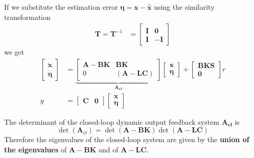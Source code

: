 If we substitute the estimation error $\bm{\eta}=\textbf{x}-\hat{\textbf{x}}$ using the similarity transformation
\begin{align*}
    \mathbf{T} =\mathbf{T}^{-1} & =\begin{bmatrix}
                                       \mathbf{I} & \mathbf{0}  \\
                                       \mathbf{I} & \mathbf{-I}
                                   \end{bmatrix}
\end{align*}
we get
\begin{align*}
    \begin{bmatrix}
        \dot{\mathbf{x}} \\
        \dot{\bm{\eta}}
    \end{bmatrix}
      & =
    \underbrace{
        \begin{bmatrix}
            \mathbf{A}-\mathbf{BK} & \mathbf{BK}              \\
            0                      & (\mathbf{A}-\mathbf{LC})
        \end{bmatrix}
    }_{\mathbf{A_{cl}}}
    \begin{bmatrix}
        \mathbf{x} \\
        \bm{\eta}
    \end{bmatrix}
    +
    \begin{bmatrix}
        \mathbf{BKS} \\
        \mathbf{0}
    \end{bmatrix}
    r                             \\
    y & = \begin{bmatrix}
              \mathbf{C} & \mathbf{0}
          \end{bmatrix}
    \begin{bmatrix}
        \textbf{x} \\
        \bm{\eta}
    \end{bmatrix}
\end{align*}

The determinant of the closed-loop dynamic output feedback system $\mathbf{A_{cl}}$ is
\begin{equation*}
    \det(\mathbf{A}_{cl})=\det(\mathbf{A}-\mathbf{BK})\det(\mathbf{A}-\mathbf{LC})
\end{equation*}
Therefore the eigenvalues of the closed-loop system are given by the \textbf{union of the eigenvalues} of $\mathbf{A}-\mathbf{BK}$ and of $\mathbf{A}-\mathbf{LC}$.
